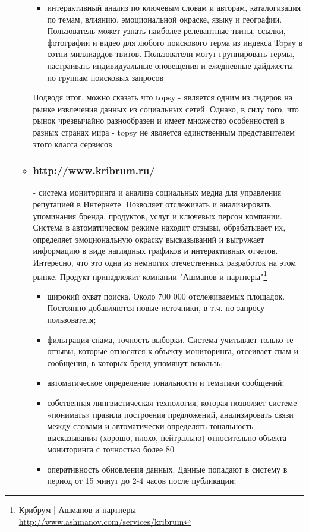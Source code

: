 \begin{itemize}
\begin{itemize}
\begin{itemize}
\item интерактивный анализ по ключевым словам и авторам, каталогизация по темам, влиянию, эмоциональной окраске, языку и географии. Пользователь может узнать наиболее релевантные твиты, ссылки, фотографии и видео для любого поискового терма из индекса Topsy в сотни миллиардов твитов. Пользователи могут группировать термы, настраивать  индивидуальные оповещения и ежедневные дайджесты по группам поисковых запросов
\end{itemize}
Подводя итог, можно сказать что topsy - является одним из лидеров на рынке извлечения данных из социальных сетей. Однако, в силу того, что рынок чрезвычайно разнообразен и имеет множество особенностей в разных странах мира -  topsy не является единственным представителем этого класса сервисов.
\item \subsubsection{http://www.kribrum.ru/} - система мониторинга и анализа социальных медиа для управления репутацией в Интернете. Позволяет отслеживать и анализировать упоминания бренда, продуктов, услуг и ключевых персон компании. Система в автоматическом режиме находит отзывы, обрабатывает их, определяет эмоциональную окраску высказываний и выгружает информацию в виде наглядных графиков и интерактивных отчетов. Интересно, что это одна из немногих отечественных разработок на этом рынке. Продукт принадлежит компании "Ашманов и партнеры"\footnote{Крибрум | Ашманов и партнеры \url{http://www.ashmanov.com/services/kribrum} }
	\begin{itemize}
	\item широкий охват поиска. Около 700 000 отслеживаемых площадок. Постоянно добавляются новые источники, в т.ч. по запросу пользователя;
	\item фильтрация спама, точность выборки. Система учитывает только те отзывы, которые относятся к объекту мониторинга, отсеивает спам и сообщения, в которых бренд упомянут вскользь;
	\item автоматическое определение тональности и тематики сообщений;
	\item собственная лингвистическая технология, которая позволяет системе «понимать» правила построения предложений, анализировать связи между словами и автоматически определять тональность высказывания (хорошо, плохо, нейтрально) относительно объекта мониторинга с точностью более 80%
	\item оперативность обновления данных. Данные попадают в систему в период от 15 минут до 2-4 часов после публикации;

\end{itemize}
\end{itemize}
\end{itemize}
